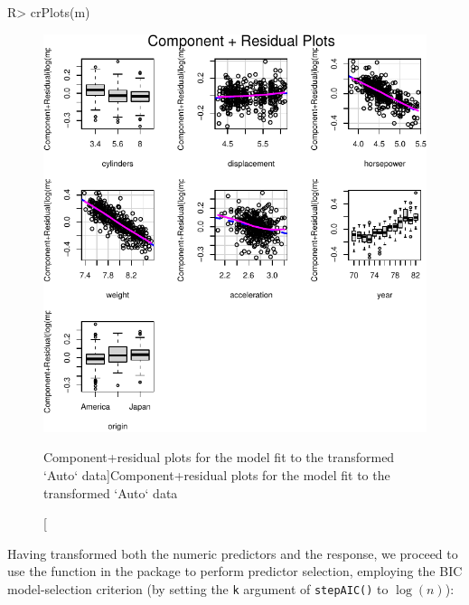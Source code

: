 \documentclass[
]{jss}
\begin{document}
\begin{CodeChunk}
\begin{CodeInput}
R> crPlots(m)
\end{CodeInput}
\begin{figure}

{\centering \includegraphics[width=0.6\linewidth]{JSS-article-reduced_files/figure-latex/Auto-CR-plots-transformed-1} 

}

\caption[Component+residual plots for the model fit to the transformed `Auto` data]{Component+residual plots for the model fit to the transformed `Auto` data}\label{fig:Auto-CR-plots-transformed}
\end{figure}
\end{CodeChunk}

Having transformed both the numeric predictors and the response, we
proceed to use the  function in the  package
to perform predictor selection, employing the BIC model-selection
criterion (by setting the \texttt{k} argument of \texttt{stepAIC()} to
\(\log(n)\)):
\end{document}
